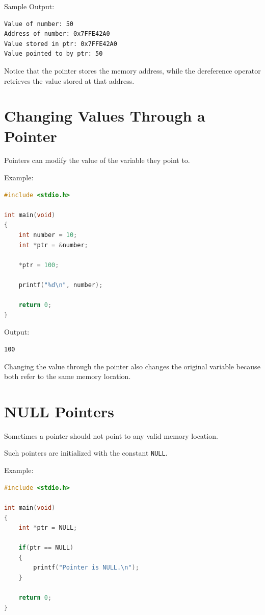 \documentclass[12pt,openany]{book}
\begin{document}
Sample Output:

\begin{lstlisting}
Value of number: 50
Address of number: 0x7FFE42A0
Value stored in ptr: 0x7FFE42A0
Value pointed to by ptr: 50
\end{lstlisting}

Notice that the pointer stores the memory address, while the dereference operator retrieves the value stored at that address.

\section{Changing Values Through a Pointer}

Pointers can modify the value of the variable they point to.

Example:

\begin{lstlisting}[language=C]
#include <stdio.h>

int main(void)
{
    int number = 10;
    int *ptr = &number;

    *ptr = 100;

    printf("%d\n", number);

    return 0;
}
\end{lstlisting}

Output:

\begin{lstlisting}
100
\end{lstlisting}

Changing the value through the pointer also changes the original variable because both refer to the same memory location.

\section{NULL Pointers}

Sometimes a pointer should not point to any valid memory location.

Such pointers are initialized with the constant \texttt{NULL}.

Example:

\begin{lstlisting}[language=C]
#include <stdio.h>

int main(void)
{
    int *ptr = NULL;

    if(ptr == NULL)
    {
        printf("Pointer is NULL.\n");
    }

    return 0;
}
\end{lstlisting}
\end{document}
